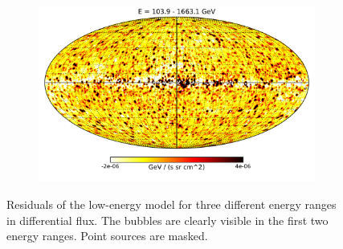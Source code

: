 \begin{figure}[t]
{\begin{subfigure}{0.3\textwidth}
    	\end{subfigure}
    	\begin{subfigure}{0.3\textwidth}
        	\includegraphics[width=\textwidth]{plots/LowE_06-16GeV_smallmask_bubblesexcl_highEsmooth_symmask_tot_highhigh_hot.pdf}
    	\end{subfigure}
    }
  	\caption{Residuals of the low-energy model for three different energy ranges in differential flux. The \Fermi bubbles are clearly visible in the first two energy ranges. Point sources are masked.}
  	\label{Maps_lowE}
\end{figure}

